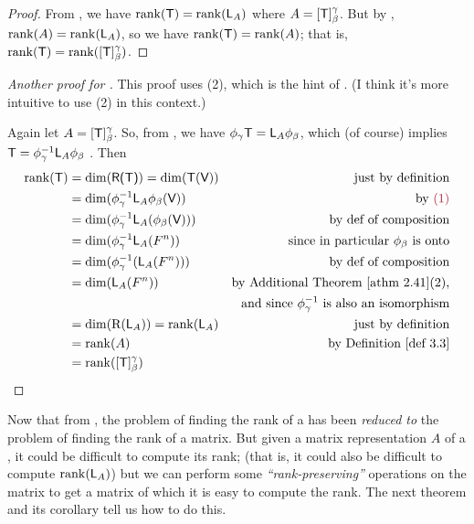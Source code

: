\begin{proof}
From , we have \(\mathrm{rank}(\textsf{T}) = \mathrm{rank}(\textsf{L}_A)\) where \(A = [\textsf{T}]_{\beta}^{\gamma}\).
But by , \(\mathrm{rank}(A) = \mathrm{rank}(\textsf{L}_A)\), so we have \(\mathrm{rank}(\textsf{T}) = \mathrm{rank}(A)\);
that is, \(\mathrm{rank}(\textsf{T}) = \mathrm{rank}([\textsf{T}]_{\beta}^{\gamma})\).
\end{proof}

\begin{proof}[Another proof for ]
This proof uses (2), which is the hint of .
(I think it's more intuitive to use (2) in this context.)

Again let \(A = [\textsf{T}]_{\beta}^{\gamma}\).
So, from , we have \(\phi_{\gamma} \textsf{T} = \textsf{L}_A \phi_{\beta}\), which (of course) implies \(\textsf{T} = \phi_{\gamma}^{-1} \textsf{L}_A \phi_{\beta}\) .
Then
\begin{align*}
    \rankT & = \dim(\RANGET) = \dim(\T(\V)) & \text{just by definition} \\
           & = \dim(\phi_{\gamma}^{-1} \LMTRAN_A \phi_{\beta}(\V)) & \text{by \MAROON{(1)}} \\
           & = \dim(\phi_{\gamma}^{-1} \LMTRAN_A (\phi_{\beta}(\V))) & \text{by def of composition} \\
           & = \dim(\phi_{\gamma}^{-1} \LMTRAN_A (F^n)) & \text{since in particular \(\phi_{\beta}\) is onto} \\
           & = \dim(\phi_{\gamma}^{-1} (\LMTRAN_A (F^n))) & \text{by def of composition} \\
           & = \dim(\LMTRAN_A (F^n)) & \text{by \ATHM{2.41}(2),} \\
           & & \text{and since \(\phi_{\gamma}^{-1}\) is also an isomorphism} \\
           & = \dim(\RANGE(\LMTRAN_A)) = \rank(\LMTRAN_A) & \text{just by definition} \\
           & = \rank(A) & \text{by \DEF{3.3}} \\
           & = \rank([\T]_{\beta}^{\gamma})
\end{align*}
\end{proof}

\begin{remark} \label{remark 3.2.3}
Now that from , the problem of finding the rank of a \LTRAN{} has been \emph{reduced to} the problem of finding the rank of a matrix.
But given a matrix representation \(A\) of a \LTRAN{}, it could be difficult to compute its rank;
(that is, it could also be difficult to compute \(\mathrm{rank}(\textsf{L}_A)\))
but we can perform some \emph{``rank-preserving''} operations on the matrix to get a matrix of which it is easy to compute the rank.
The next theorem and its corollary tell us how to do this.
\end{remark}

